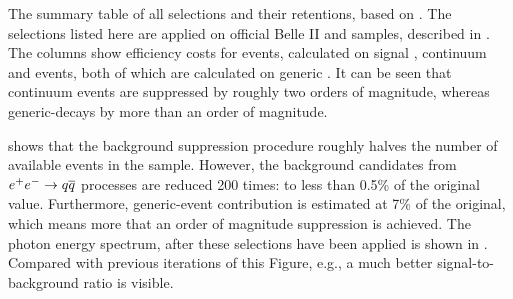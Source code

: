 \begin{table}[htbp!]
    \centering
    \caption{\label{tab:cutflow} The summary table of all selections and their retentions, based on .
    The selections listed here are applied on official Belle II \feiBp and \feiBz samples, described in .
    The columns show efficiency costs for \BtoXsgamma events, calculated on signal \MC, continuum and \BB events, both of which are calculated on generic \MC.
    It can be seen that continuum events are suppressed by roughly two orders of magnitude, whereas generic-\BB decays by more than an order of magnitude.
    }
    
\end{table}

 shows that the background suppression procedure roughly halves the number of available \BtoXsgamma events in the sample.
However, the background candidates from \mbox{$e^+e^-\rightarrow q\overline q$} processes are reduced 200 times: to less than 0.5\% of the original value.
Furthermore, generic-\BB event contribution is estimated at 7\% of the original, which means more that an order of magnitude suppression is achieved.
The photon energy spectrum, after these selections have been applied is shown in .
Compared with previous iterations of this Figure, e.g., a much better signal-to-background ratio is visible.

